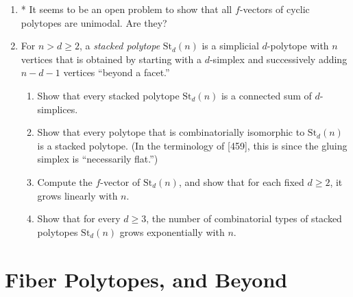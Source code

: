 \documentclass{article}
\begin{document}
\begin{enumerate}
Thus, in general $M(d,n)$ is smaller than the value $f_0(C_d(n)^\Delta)$ provided by the upper bound theorem. Compare Problem 3.11*.)

\item* It seems to be an open problem to show that all $f$-vectors of cyclic polytopes are unimodal. Are they?

\item For $n>d\ge 2$, a \emph{stacked polytope} $\mathrm{St}_d(n)$ is a simplicial $d$-polytope with $n$ vertices that is obtained by starting with a $d$-simplex and successively adding $n-d-1$ vertices ``beyond a facet.''
\begin{enumerate}[label=(\roman*)]
\item Show that every stacked polytope $\mathrm{St}_d(n)$ is a connected sum of $d$-simplices.
\item Show that every polytope that is combinatorially isomorphic to $\mathrm{St}_d(n)$ is a stacked polytope. (In the terminology of [459], this is since the gluing simplex is ``necessarily flat.'')
\item Compute the $f$-vector of $\mathrm{St}_d(n)$, and show that for each fixed $d\ge 2$, it grows linearly with $n$.
\item Show that for every $d\ge 3$, the number of combinatorial types of stacked polytopes $\mathrm{St}_d(n)$ grows exponentially with $n$.
\end{enumerate}
\end{enumerate}


\bigskip
\section{Fiber Polytopes, and Beyond}
\end{document}
